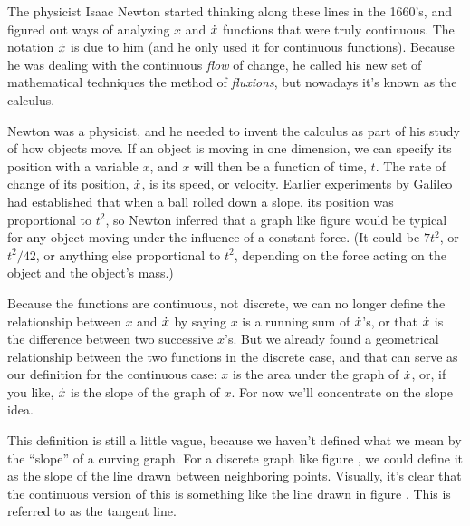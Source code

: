 
The physicist Isaac Newton started
thinking along these lines in the 1660's, and figured out ways of analyzing
$x$ and $\dot{x}$ functions that were truly continuous. The notation $\dot{x}$
is due to him (and he only used it for continuous functions). Because he was
dealing with the continuous \emph{flow} of change, he called his new set of mathematical
techniques the method of \emph{fluxions}, but nowadays it's known as the calculus.

Newton was a physicist, and he needed to invent the calculus as part of his study
of how objects move. If an object is moving in one dimension, we can specify its
position with a variable $x$, and $x$ will then be a function of time, $t$.
The rate of change of its position, $\dot{x}$, is its speed, or velocity.
Earlier experiments by Galileo
had established that when a ball rolled down
a slope, its position was proportional to $t^2$, so Newton inferred that
a graph like figure  would be typical for any object
moving under the influence of a constant force. (It could be $7t^2$, or
$t^2/42$, or anything else proportional to $t^2$, depending on the force
acting on the object and the object's mass.)

Because the functions are continuous, not discrete, we can no longer define
the relationship between $x$ and $\dot{x}$ by saying $x$ is a running sum of
$\dot{x}$'s, or that $\dot{x}$ is the difference between two successive $x$'s.
But we already found a geometrical relationship between the two functions
in the discrete case, and that can serve as our definition for the continuous
case: $x$ is the area under the graph of $\dot{x}$, or, if you like,
$\dot{x}$ is the slope of the graph of $x$. For now
we'll concentrate on the slope idea.

%
This definition is still a little vague, because we haven't defined what we mean
by the ``slope'' of a curving graph. For a discrete graph like figure ,
we could define it as the slope of the line drawn between neighboring points. Visually,
it's clear that the continuous version of this is something like the line drawn
in figure . This is referred to as the tangent line.

